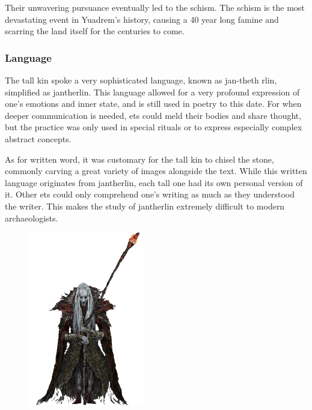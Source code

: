 \begin{linenumbers}
Their unwavering pursuance eventually led to the schism.
The schism is the most devastating event in Yuadrem's history, causing a 40 year long famine and scarring the land itself for the centuries to come.

\subsubsection{Language}
The tall kin spoke a very sophisticated language, known as jan-theth rlin, simplified as jantherlin.
This language allowed for a very profound expression of one's emotions and inner state, and is still used in poetry to this date.
For when deeper communication is needed, ets could meld their bodies and share thought, but the practice was only used in special rituals or to express especially complex abstract concepts.

As for written word, it was customary for the tall kin to chisel the stone, commonly carving a great variety of images alongside the text.
While this written language originates from jantherlin, each tall one had its own personal version of it.
Other ets could only comprehend one's writing as much as they understood the writer.
This makes the study of jantherlin extremely difficult to modern archaeologists.

\begin{figure}[t]
    \centering
    \includegraphics[width=0.45\textwidth]{02kins/img/10et_cleric.png}
\end{figure}

\end{linenumbers}

